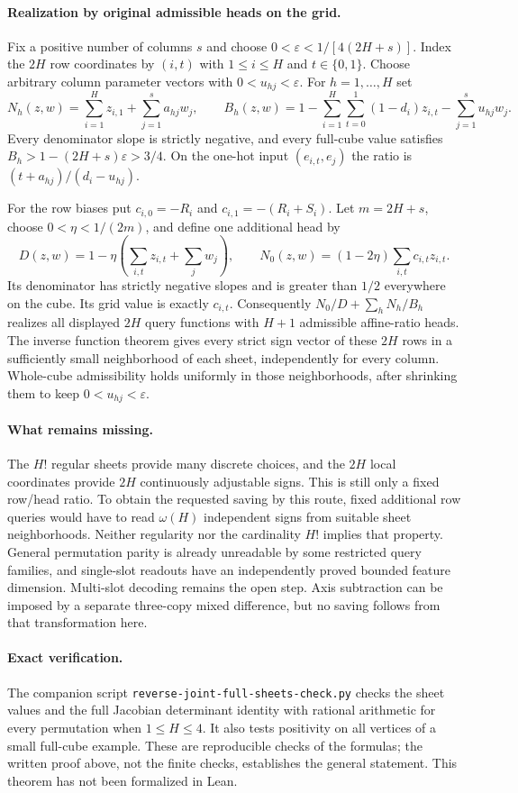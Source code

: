 \documentclass[11pt]{article}
\begin{document}
\paragraph{Realization by original admissible heads on the grid.}
Fix a positive number of columns $s$ and choose
$0<\varepsilon<1/[4(2H+s)]$. Index the $2H$ row coordinates by
$(i,t)$ with $1\leq i\leq H$ and $t\in\{0,1\}$.
Choose arbitrary column parameter vectors with $0<u_{hj}<\varepsilon$.
For $h=1,\ldots,H$ set
\[
 N_h(z,w)=\sum_{i=1}^H z_{i,1}+\sum_{j=1}^s a_{hj}w_j,
 \qquad
 B_h(z,w)=1-\sum_{i=1}^H\sum_{t=0}^1(1-d_i)z_{i,t}
                 -\sum_{j=1}^s u_{hj}w_j.
\]
Every denominator slope is strictly negative, and every full-cube
value satisfies $B_h>1-(2H+s)\varepsilon>3/4$.
On the one-hot input $(e_{i,t},e_j)$ the ratio is
$(t+a_{hj})/(d_i-u_{hj})$.

For the row biases put $c_{i,0}=-R_i$ and
$c_{i,1}=-(R_i+S_i)$. Let $m=2H+s$, choose
$0<\eta<1/(2m)$, and define one additional head by
\[
 D(z,w)=1-\eta\left(\sum_{i,t}z_{i,t}+\sum_jw_j\right),
 \qquad
 N_0(z,w)=(1-2\eta)\sum_{i,t}c_{i,t}z_{i,t}.
\]
Its denominator has strictly negative slopes and is greater than
$1/2$ everywhere on the cube. Its grid value is exactly $c_{i,t}$.
Consequently $N_0/D+\sum_hN_h/B_h$ realizes all displayed
$2H$ query functions with $H+1$ admissible affine-ratio heads.
The inverse function theorem gives every strict sign vector of these
$2H$ rows in a sufficiently small neighborhood of each sheet, independently
for every column. Whole-cube admissibility holds uniformly in those
neighborhoods, after shrinking them to keep $0<u_{hj}<\varepsilon$.

\paragraph{What remains missing.}
The $H!$ regular sheets provide many discrete choices, and the
$2H$ local coordinates provide $2H$ continuously adjustable signs.
This is still only a fixed row/head ratio. To obtain the requested
saving by this route, fixed additional row queries would have to
read $\omega(H)$ independent signs from suitable sheet neighborhoods.
Neither regularity nor the cardinality $H!$ implies that property.
General permutation parity is already unreadable by some restricted
query families, and single-slot readouts have an independently proved
bounded feature dimension. Multi-slot decoding remains the open step.
Axis subtraction can be imposed by a separate three-copy mixed
difference, but no saving follows from that transformation here.

\paragraph{Exact verification.}
The companion script \texttt{reverse-joint-full-sheets-check.py}
checks the sheet values and the full Jacobian determinant identity
with rational arithmetic for every permutation when $1\leq H\leq4$.
It also tests positivity on all vertices of a small full-cube example.
These are reproducible checks of the formulas; the written proof above,
not the finite checks, establishes the general statement. This theorem
has not been formalized in Lean.
\end{document}
